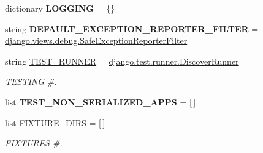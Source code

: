 \begin{DoxyCompactItemize}
\mbox{\label{namespacedjango_1_1conf_1_1global__settings_a68993712c3951f175e4e9a606ce1c8f9}} 
dictionary {\bfseries L\+O\+G\+G\+I\+NG} = \{\}
\item 
\mbox{\label{namespacedjango_1_1conf_1_1global__settings_a6c0e452d79770ee9c2d64ba445a5cc20}} 
string {\bfseries D\+E\+F\+A\+U\+L\+T\+\_\+\+E\+X\+C\+E\+P\+T\+I\+O\+N\+\_\+\+R\+E\+P\+O\+R\+T\+E\+R\+\_\+\+F\+I\+L\+T\+ER} = \textquotesingle{}\mbox{\hyperlink{classdjango_1_1views_1_1debug_1_1_safe_exception_reporter_filter}{django.\+views.\+debug.\+Safe\+Exception\+Reporter\+Filter}}\textquotesingle{}
\item 
\mbox{\label{namespacedjango_1_1conf_1_1global__settings_a295d1443c17b300135d72457e4d398ba}} 
string \mbox{\hyperlink{namespacedjango_1_1conf_1_1global__settings_a295d1443c17b300135d72457e4d398ba}{T\+E\+S\+T\+\_\+\+R\+U\+N\+N\+ER}} = \textquotesingle{}\mbox{\hyperlink{classdjango_1_1test_1_1runner_1_1_discover_runner}{django.\+test.\+runner.\+Discover\+Runner}}\textquotesingle{}
\begin{DoxyCompactList}\small\item\em T\+E\+S\+T\+I\+NG \#. \end{DoxyCompactList}\item 
\mbox{\label{namespacedjango_1_1conf_1_1global__settings_aab6af48e6fcdb9818a2f2f609eb18208}} 
list {\bfseries T\+E\+S\+T\+\_\+\+N\+O\+N\+\_\+\+S\+E\+R\+I\+A\+L\+I\+Z\+E\+D\+\_\+\+A\+P\+PS} = \mbox{[}$\,$\mbox{]}
\item 
\mbox{\label{namespacedjango_1_1conf_1_1global__settings_a9aaf1d6896e1705eb37181bc911718f4}} 
list \mbox{\hyperlink{namespacedjango_1_1conf_1_1global__settings_a9aaf1d6896e1705eb37181bc911718f4}{F\+I\+X\+T\+U\+R\+E\+\_\+\+D\+I\+RS}} = \mbox{[}$\,$\mbox{]}
\begin{DoxyCompactList}\small\item\em F\+I\+X\+T\+U\+R\+ES \#. \end{DoxyCompactList}\item 
\mbox{\label{namespacedjango_1_1conf_1_1global__settings_a77c1bc7077c48586c9679bb99cdab239}} 

\end{DoxyCompactItemize}
